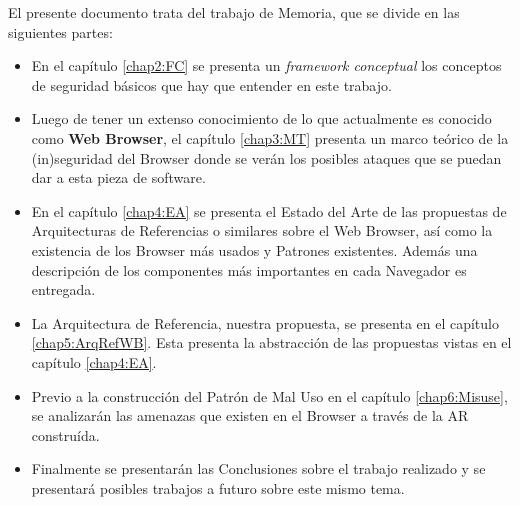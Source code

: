El presente documento trata del trabajo de Memoria, que se divide en las siguientes partes:

\begin{itemize}
	\item En el capítulo \ref{chap2:FC} se presenta un \textit{framework conceptual} los conceptos de seguridad básicos que hay que entender en este trabajo.
	\item Luego de tener un extenso conocimiento de lo que actualmente es conocido como \textbf{Web Browser}, el capítulo \ref{chap3:MT} presenta un marco teórico de la (in)seguridad del Browser donde se verán los posibles ataques que se puedan dar a esta pieza de software.
	\item En el capítulo \ref{chap4:EA} se presenta el Estado del Arte de las propuestas de Arquitecturas de Referencias o similares sobre el Web Browser, así como la existencia de los Browser más usados y Patrones existentes. Además una descripción de los componentes más importantes en cada Navegador es entregada.
	\item La Arquitectura de Referencia, nuestra propuesta, se presenta en el capítulo \ref{chap5:ArqRefWB}. Esta presenta la abstracción de las propuestas vistas en el capítulo \ref{chap4:EA}.
	\item Previo a la construcción del Patrón de Mal Uso en el capítulo \ref{chap6:Misuse}, se analizarán las amenazas que existen en el Browser a través de la AR construída. 
	\item Finalmente se presentarán las Conclusiones sobre el trabajo realizado y se presentará posibles trabajos a futuro sobre este mismo tema.
\end{itemize}












